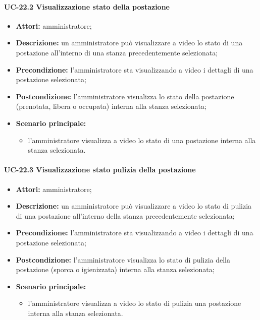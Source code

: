 \paragraph{UC-22.2 Visualizzazione stato della postazione}
\begin{itemize}
    \item \textbf{Attori:} amministratore;
    \item \textbf{Descrizione:} un amministratore pu\`{o} visualizzare a video lo stato di una postazione all'interno di una stanza precedentemente selezionata;
    \item \textbf{Precondizione:} l'amministratore sta visualizzando a video i dettagli di una postazione selezionata;
    \item \textbf{Postcondizione:} l'amministratore visualizza lo stato della postazione (prenotata, libera o occupata) interna alla stanza selezionata;
    \item \textbf{Scenario principale:}
    \begin{itemize}
        \item l'amministratore visualizza a video lo stato di una postazione interna alla stanza selezionata.
    \end{itemize}
\end{itemize}
    

\paragraph{UC-22.3 Visualizzazione stato pulizia della postazione} %
\begin{itemize}
    \item \textbf{Attori:} amministratore;
    \item \textbf{Descrizione:} un amministratore pu\`{o} visualizzare a video lo stato di pulizia di una postazione all'interno della stanza precedentemente selezionata;
    \item \textbf{Precondizione:} l'amministratore sta visualizzando a video i dettagli di una postazione selezionata;
    \item \textbf{Postcondizione:} l'amministratore visualizza lo stato di pulizia della postazione (sporca o igienizzata) interna alla stanza selezionata;
    \item \textbf{Scenario principale:}
    \begin{itemize}
        \item l'amministratore visualizza a video lo stato di pulizia una postazione interna alla stanza selezionata.
    \end{itemize}
\end{itemize}


